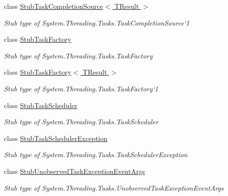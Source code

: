 \begin{DoxyCompactItemize}
class \hyperlink{class_system_1_1_threading_1_1_tasks_1_1_fakes_1_1_stub_task_completion_source_3_01_t_result_01_4}{Stub\-Task\-Completion\-Source$<$ T\-Result $>$}
\begin{DoxyCompactList}\small\item\em Stub type of System.\-Threading.\-Tasks.\-Task\-Completion\-Source`1\end{DoxyCompactList}\item 
class \hyperlink{class_system_1_1_threading_1_1_tasks_1_1_fakes_1_1_stub_task_factory}{Stub\-Task\-Factory}
\begin{DoxyCompactList}\small\item\em Stub type of System.\-Threading.\-Tasks.\-Task\-Factory\end{DoxyCompactList}\item 
class \hyperlink{class_system_1_1_threading_1_1_tasks_1_1_fakes_1_1_stub_task_factory_3_01_t_result_01_4}{Stub\-Task\-Factory$<$ T\-Result $>$}
\begin{DoxyCompactList}\small\item\em Stub type of System.\-Threading.\-Tasks.\-Task\-Factory`1\end{DoxyCompactList}\item 
class \hyperlink{class_system_1_1_threading_1_1_tasks_1_1_fakes_1_1_stub_task_scheduler}{Stub\-Task\-Scheduler}
\begin{DoxyCompactList}\small\item\em Stub type of System.\-Threading.\-Tasks.\-Task\-Scheduler\end{DoxyCompactList}\item 
class \hyperlink{class_system_1_1_threading_1_1_tasks_1_1_fakes_1_1_stub_task_scheduler_exception}{Stub\-Task\-Scheduler\-Exception}
\begin{DoxyCompactList}\small\item\em Stub type of System.\-Threading.\-Tasks.\-Task\-Scheduler\-Exception\end{DoxyCompactList}\item 
class \hyperlink{class_system_1_1_threading_1_1_tasks_1_1_fakes_1_1_stub_unobserved_task_exception_event_args}{Stub\-Unobserved\-Task\-Exception\-Event\-Args}
\begin{DoxyCompactList}\small\item\em Stub type of System.\-Threading.\-Tasks.\-Unobserved\-Task\-Exception\-Event\-Args\end{DoxyCompactList}\end{DoxyCompactItemize}
